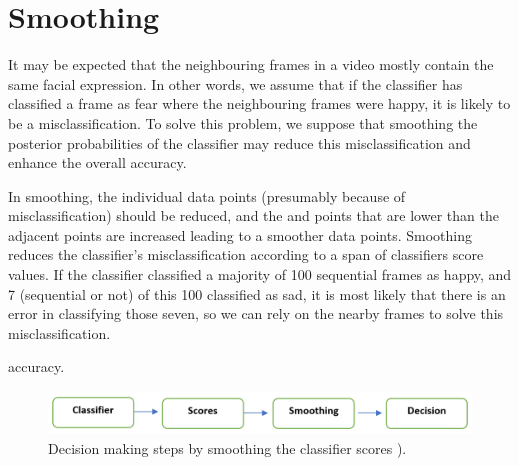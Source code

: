 %
%
%
%








\section{Smoothing}
\label{smooting_PP}
It may be expected that the neighbouring frames in a video mostly contain the same facial expression. In other words, we assume that if the classifier has classified a frame as fear where the neighbouring frames were happy, it is likely to be a misclassification. To solve this problem, we suppose that smoothing the posterior probabilities of the classifier may reduce this misclassification and enhance the overall accuracy.

In smoothing, the individual data points (presumably because of misclassification) should be reduced, and the and points that are lower than the adjacent points are increased leading to a smoother data points\citep{simonoff2012smoothing}. 
Smoothing reduces the classifier's misclassification according to a span of classifiers score values. If the classifier classified a majority of 100 sequential frames as happy, and 7 (sequential or not) of this 100 classified as sad, it is most likely that there is an error in classifying those seven, so we can rely on the nearby frames to solve this misclassification.


 accuracy.%
\begin{figure}[tb]
	\centering
	\includegraphics[width=1\textwidth]{Chapter5/Figs/SmoothPros.png}
	\caption{Decision making steps by smoothing the classifier scores ).}
	\label{fig:decisionsteps}
\end{figure}



